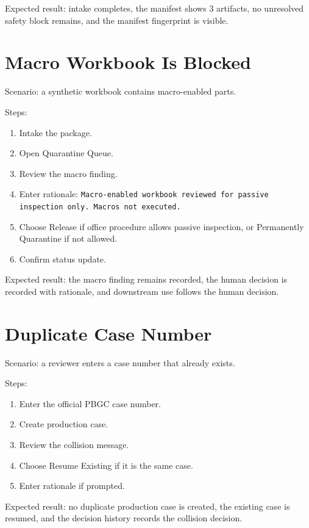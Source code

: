 Expected result: intake completes, the manifest shows 3 artifacts, no unresolved safety block remains, and the manifest fingerprint is visible.

\section{Macro Workbook Is Blocked}

Scenario: a synthetic workbook contains macro-enabled parts.

Steps:

\begin{enumerate}
  \item Intake the package.
  \item Open Quarantine Queue.
  \item Review the macro finding.
  \item Enter rationale: \texttt{Macro-enabled workbook reviewed for passive inspection only. Macros not executed.}
  \item Choose Release if office procedure allows passive inspection, or Permanently Quarantine if not allowed.
  \item Confirm status update.
\end{enumerate}

Expected result: the macro finding remains recorded, the human decision is recorded with rationale, and downstream use follows the human decision.

\section{Duplicate Case Number}

Scenario: a reviewer enters a case number that already exists.

Steps:

\begin{enumerate}
  \item Enter the official PBGC case number.
  \item Create production case.
  \item Review the collision message.
  \item Choose Resume Existing if it is the same case.
  \item Enter rationale if prompted.
\end{enumerate}

Expected result: no duplicate production case is created, the existing case is resumed, and the decision history records the collision decision.

